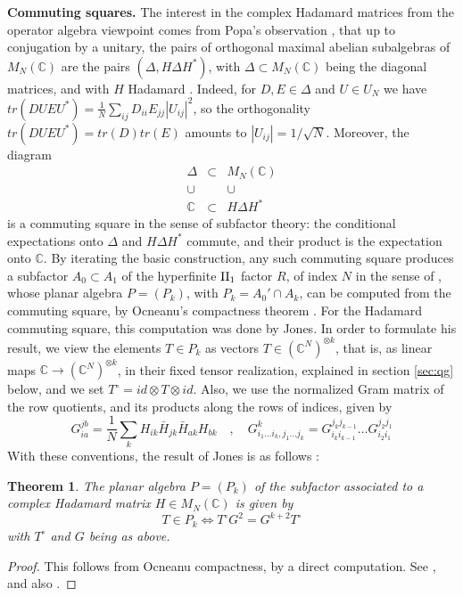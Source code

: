 \documentclass[11pt]{amsart}
\newtheorem{theorem}{Theorem}[section]
\begin{document}
\medskip

\noindent\textbf{Commuting squares.} The interest in the complex Hadamard matrices from the operator algebra viewpoint comes from Popa's observation \cite{pop}, that up to conjugation by a unitary, the pairs of orthogonal maximal abelian subalgebras of $M_N(\mathbb C)$ are the pairs $(\Delta,H\Delta H^*)$, with $\Delta\subset M_N(\mathbb C)$ being the diagonal matrices, and with $H$ Hadamard \cite{ha1}. Indeed, for $D,E\in\Delta$ and $U\in U_N$ we have $tr(DUEU^*)=\frac{1}{N}\sum_{ij}D_{ii}E_{jj}|U_{ij}|^2$, so the orthogonality $tr(DUEU^*)=tr(D)tr(E)$ amounts to $|U_{ij}|=1/\sqrt N$. Moreover, the diagram
$$\begin{matrix}\Delta&\subset&M_N(\mathbb C)\\ \cup&&\cup\\ \mathbb C&\subset&H\Delta H^*\end{matrix}$$
is a commuting square in the sense of subfactor theory: the conditional expectations onto $\Delta$ and $H\Delta H^*$ commute, and their product is the expectation onto $\mathbb C$. By iterating the basic construction, any such commuting square produces a subfactor $A_0\subset A_1$ of the hyperfinite ${\rm II}_1$ factor $R$, of index $N$ in the sense of \cite{jo1}, whose planar algebra $P=(P_k)$, with $P_k=A_0'\cap A_k$, can be computed from the commuting square, by Ocneanu's compactness theorem \cite{jsu,ocn}. For the Hadamard commuting square, this computation was done by Jones. In order to formulate his result, we view the elements $T\in P_k$ as vectors $T\in(\mathbb C^N)^{\otimes k}$, that is, as linear maps $\mathbb C\to(\mathbb C^N)^{\otimes k}$, in their fixed tensor realization, explained in section \ref{sec:qg} below, and we set $T^\circ=id\otimes T\otimes id$. Also, we use the normalized Gram matrix of the row quotients, and its products along the rows of indices, given by
$$G_{ia}^{jb}=\frac{1}{N}\sum_kH_{ik}\bar{H}_{jk}\bar{H}_{ak}H_{bk}\quad,\quad G^k_{i_1\ldots i_k,j_1\ldots j_k}=G_{i_ki_{k-1}}^{j_kj_{k-1}}\ldots G_{i_2i_1}^{j_2j_1}$$
With these conventions, the result of Jones is as follows \cite{jo2,jon}:

\begin{theorem}\label{thm:jones}
The planar algebra $P=(P_k)$ of the subfactor associated to a complex Hadamard matrix $H\in M_N(\mathbb C)$ is given by
$$T\in P_k\iff T^\circ G^2=G^{k+2}T^\circ$$
with $T^\circ$ and $G$ being as above.
\end{theorem}

\begin{proof}
This follows from Ocneanu compactness, by a direct computation. See \cite{jo2,jon}, and also \cite[Theorem 14.23]{banicaHM}.
\end{proof}
\end{document}

